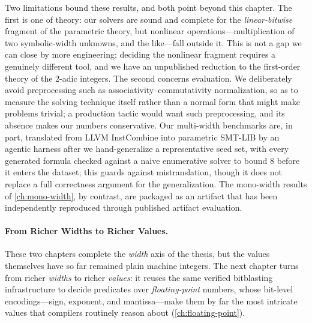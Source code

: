 Two limitations bound these results, and both point beyond this chapter. The
first is one of theory: our solvers are sound and complete for the
\emph{linear-bitwise} fragment of the parametric theory, but nonlinear
operations---multiplication of two symbolic-width unknowns, and the like---fall
outside it. This is not a gap we can close by more engineering; deciding the
nonlinear fragment requires a genuinely different tool, and we have an
unpublished reduction to the first-order theory of the $2$-adic integers.
The second concerns evaluation. We deliberately avoid
preprocessing such as associativity--commutativity normalization, so as to
measure the solving technique itself rather than a normal form that might make
problems trivial; a production tactic would want such preprocessing, and its
absence makes our numbers conservative. Our multi-width benchmarks are, in part,
translated from LLVM InstCombine into parametric SMT-LIB by an agentic harness
after we hand-generalize a representative seed set, with every generated formula
checked against a naive enumerative solver to bound $8$ before it enters the
dataset; this guards against mistranslation, though it does not replace a full
correctness argument for the generalization. The mono-width results of
\cref{ch:mono-width}, by contrast, are packaged as an artifact that has been
independently reproduced through published artifact evaluation.

\paragraph{From Richer Widths to Richer Values.}
These two chapters complete the \emph{width} axis of the thesis, but the values
themselves have so far remained plain machine integers. The next chapter turns
from richer \emph{widths} to richer \emph{values}: it reuses the same verified
bitblasting infrastructure to decide predicates over \emph{floating-point}
numbers, whose bit-level encodings---sign, exponent, and mantissa---make them by
far the most intricate values that compilers routinely reason about
(\cref{ch:floating-point}).
